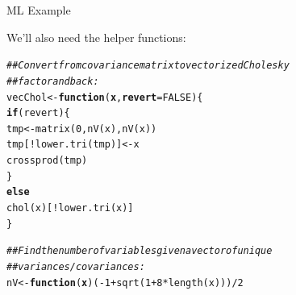 \documentclass{beamer}\usepackage[]{graphicx}\usepackage[]{color}
\makeatletter
\newcommand{\hlnum}[1]{\textcolor[rgb]{0.69,0.494,0}{#1}}%
\newcommand{\hlcom}[1]{\textcolor[rgb]{0.514,0.506,0.514}{\textit{#1}}}%
\newcommand{\hlopt}[1]{\textcolor[rgb]{0,0,0}{#1}}%
\newcommand{\hlstd}[1]{\textcolor[rgb]{0,0,0}{#1}}%
\newcommand{\hlkwa}[1]{\textcolor[rgb]{0,0,0}{\textbf{#1}}}%
\newcommand{\hlkwb}[1]{\textcolor[rgb]{0,0.341,0.682}{#1}}%
\newcommand{\hlkwc}[1]{\textcolor[rgb]{0,0,0}{\textbf{#1}}}%
\newcommand{\hlkwd}[1]{\textcolor[rgb]{0.004,0.004,0.506}{#1}}%
\newenvironment{kframe}{%
 \def\at@end@of@kframe{}%
 \ifinner\ifhmode%
  \def\at@end@of@kframe{\end{minipage}}%
  \begin{minipage}{\columnwidth}%
 \fi\fi%
 \def\FrameCommand##1{\hskip\@totalleftmargin \hskip-\fboxsep
 \colorbox{shadecolor}{##1}\hskip-\fboxsep
     \hskip-\linewidth \hskip-\@totalleftmargin \hskip\columnwidth}%
 \MakeFramed {\advance\hsize-\width
   \@totalleftmargin\z@ \linewidth\hsize
   \@setminipage}}%
 {\par\unskip\endMakeFramed%
 \at@end@of@kframe}
\newenvironment{knitrout}{}{} %
\makeatother
\begin{document}
\begin{frame}[fragile]{ML Example}

  We'll also need the helper functions:
  
\begin{knitrout}\footnotesize
{}\color{fgcolor}\begin{kframe}
\begin{alltt}
\hlcom{## Convert from covariance matrix to vectorized Cholesky }
\hlcom{## factor and back:}
\hlstd{vecChol} \hlkwb{<-} \hlkwa{function}\hlstd{(}\hlkwc{x}\hlstd{,} \hlkwc{revert} \hlstd{=} \hlnum{FALSE}\hlstd{) \{}
    \hlkwa{if}\hlstd{(revert) \{}
        \hlstd{tmp}                  \hlkwb{<-} \hlkwd{matrix}\hlstd{(}\hlnum{0}\hlstd{,} \hlkwd{nV}\hlstd{(x),} \hlkwd{nV}\hlstd{(x))}
        \hlstd{tmp[}\hlopt{!}\hlkwd{lower.tri}\hlstd{(tmp)]} \hlkwb{<-} \hlstd{x}
        \hlkwd{crossprod}\hlstd{(tmp)}
    \hlstd{\}}
    \hlkwa{else}
        \hlkwd{chol}\hlstd{(x)[}\hlopt{!}\hlkwd{lower.tri}\hlstd{(x)]}
\hlstd{\}}

\hlcom{## Find the number of variables given a vector of unique }
\hlcom{## variances/covariances:}
\hlstd{nV} \hlkwb{<-} \hlkwa{function}\hlstd{(}\hlkwc{x}\hlstd{) (}\hlopt{-}\hlnum{1} \hlopt{+} \hlkwd{sqrt}\hlstd{(}\hlnum{1} \hlopt{+} \hlnum{8} \hlopt{*} \hlkwd{length}\hlstd{(x)))} \hlopt{/} \hlnum{2}
\end{alltt}
\end{kframe}
\end{knitrout}

\end{frame}

\end{document}
